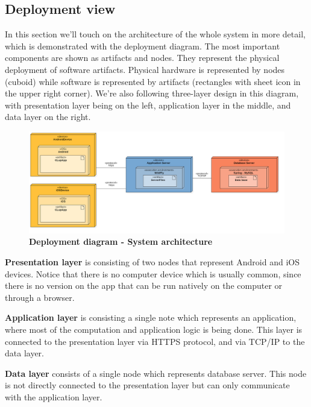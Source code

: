\subsection{Deployment view}
\hspace{\parindent} In this section we'll touch on the architecture of the whole system in more detail, which is demonstrated with the deployment diagram. The most important components are shown as artifacts and nodes. They represent the physical deployment of software artifacts. Physical hardware is represented by nodes (cuboid) while software is represented by artifacts (rectangles with sheet icon in the upper right corner). We're also following three-layer design in this diagram, with presentation layer being on the left, application layer in the middle, and data layer on the right.   

\begin{figure}[!h]
\centering
\includegraphics[width=\textwidth]{Images/DeploymentDiagram1v2}
\caption{\label{fig:deploymentdiagram}\textbf{Deployment diagram -  System architecture}}
\end{figure}


\textbf{Presentation layer} is consisting of two nodes that represent Android and iOS devices. Notice that there is no computer device which is usually common, since there is no version on the app that can be run natively on the computer or through a browser.   

  

\textbf{Application layer }is consisting a single note which represents an application, where most of the computation and application logic is being done. This layer is connected to the presentation layer via HTTPS protocol, and via TCP/IP to the data layer.  

  

\textbf{Data layer} consists of a single node which represents database server. This node is not directly connected to the presentation layer but can only communicate with the application layer.  

